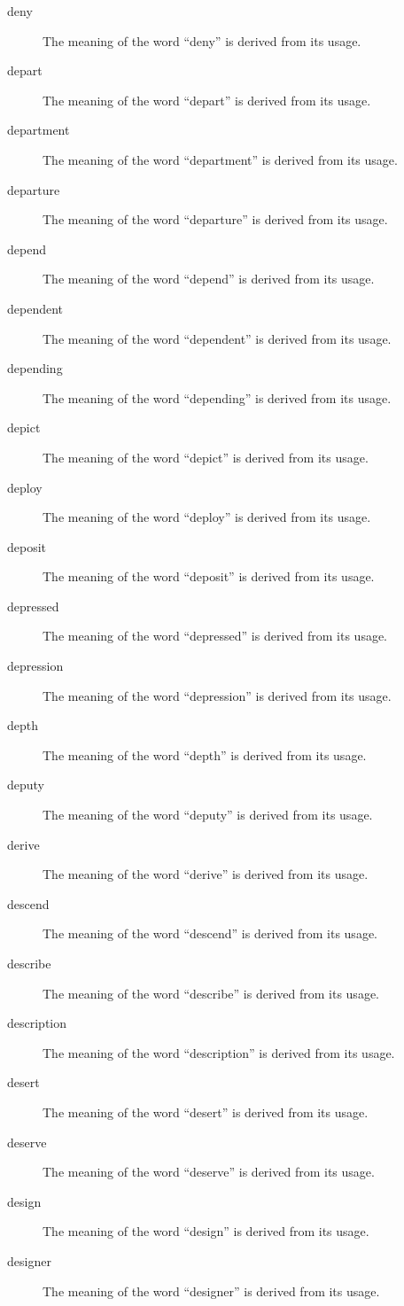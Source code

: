 \documentclass[12pt, letterpaper]{memoir}
\begin{document}
\begin{description}
\item[deny] The meaning of the word ``deny'' is derived from its usage.
\item[depart] The meaning of the word ``depart'' is derived from its usage.
\item[department] The meaning of the word ``department'' is derived from its usage.
\item[departure] The meaning of the word ``departure'' is derived from its usage.
\item[depend] The meaning of the word ``depend'' is derived from its usage.
\item[dependent] The meaning of the word ``dependent'' is derived from its usage.
\item[depending] The meaning of the word ``depending'' is derived from its usage.
\item[depict] The meaning of the word ``depict'' is derived from its usage.
\item[deploy] The meaning of the word ``deploy'' is derived from its usage.
\item[deposit] The meaning of the word ``deposit'' is derived from its usage.
\item[depressed] The meaning of the word ``depressed'' is derived from its usage.
\item[depression] The meaning of the word ``depression'' is derived from its usage.
\item[depth] The meaning of the word ``depth'' is derived from its usage.
\item[deputy] The meaning of the word ``deputy'' is derived from its usage.
\item[derive] The meaning of the word ``derive'' is derived from its usage.
\item[descend] The meaning of the word ``descend'' is derived from its usage.
\item[describe] The meaning of the word ``describe'' is derived from its usage.
\item[description] The meaning of the word ``description'' is derived from its usage.
\item[desert] The meaning of the word ``desert'' is derived from its usage.
\item[deserve] The meaning of the word ``deserve'' is derived from its usage.
\item[design] The meaning of the word ``design'' is derived from its usage.
\item[designer] The meaning of the word ``designer'' is derived from its usage.

\end{description}
\end{document}
